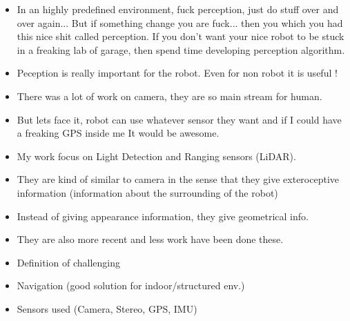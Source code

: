 \begin{itemize}
        \item In an highly predefined environment, fuck perception, just do stuff over and over again... But if something change you are fuck... then you which you had this nice shit called perception. If you don't want your nice robot to be stuck in a freaking lab of garage, then spend time developing perception algorithm. 
    \item Peception is really important for the robot. Even for non robot it is useful !
    \item There was a lot of work on camera, they are so main stream for human.
    \item But lets face it, robot can use whatever sensor they want and if I could have a freaking GPS inside me It would be awesome.
\end{itemize}

\begin{itemize}
    \item My work focus on Light Detection and Ranging sensors (LiDAR).
    \item They are kind of similar to camera in the sense that they give exteroceptive information (information about the surrounding of the robot)
    \item Instead of giving appearance information, they give geometrical info.
    \item They are also more recent and less work have been done these.
\end{itemize}

\begin{itemize}
    \item Definition of challenging
    \item Navigation (good solution for indoor/structured env.)
    \item Sensors used (Camera, Stereo, GPS, IMU)
\end{itemize}
